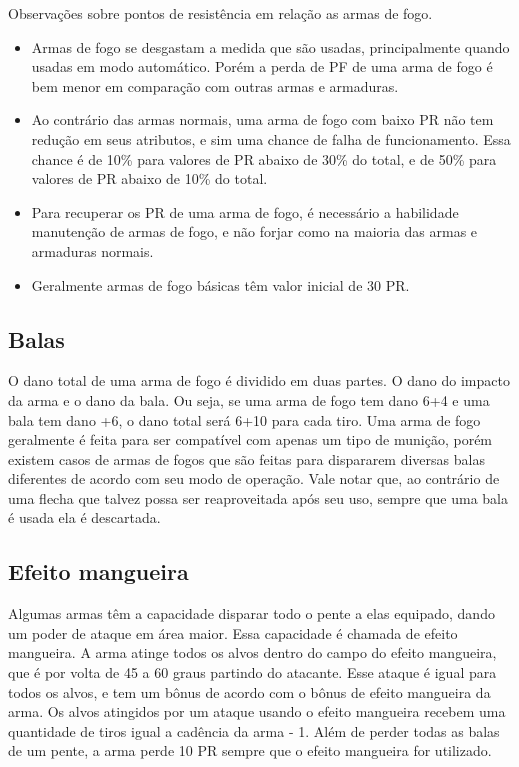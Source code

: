 Observações sobre pontos de resistência em relação as armas de fogo.
\begin{itemize}
	\item Armas de fogo se desgastam a medida que são usadas, principalmente quando usadas em modo automático. Porém a perda de PF de uma arma de fogo é bem menor em comparação com outras armas e armaduras. 

	\item Ao contrário das armas normais, uma arma de fogo com baixo PR não tem redução em seus atributos, e sim uma chance de falha de funcionamento. Essa chance é de 10\% para valores de PR abaixo de 30\% do total, e de 50\% para valores de PR abaixo de 10\% do total. 

	\item Para recuperar os PR de uma arma de fogo, é necessário a habilidade manutenção de armas de fogo, e não forjar como na maioria das armas e armaduras normais.

	\item Geralmente armas de fogo básicas têm valor inicial de 30 PR. 
\end{itemize}

\subsection{Balas}

O dano total de uma arma de fogo é dividido em duas partes. O dano do impacto da arma e o dano da bala. Ou seja, se uma arma de fogo tem dano 6+4 e uma bala tem dano +6, o dano total será 6+10 para cada tiro. Uma arma de fogo geralmente é feita para ser compatível com apenas um tipo de munição, porém existem casos de armas de fogos que são feitas para dispararem diversas balas diferentes de acordo com seu modo de operação. Vale notar que, ao contrário de uma flecha que talvez possa ser reaproveitada após seu uso, sempre que uma bala é usada ela é descartada.


\subsection{Efeito mangueira}

Algumas armas têm a capacidade disparar todo o pente a elas equipado, dando um poder de ataque em área maior. Essa capacidade é chamada de efeito mangueira. A arma atinge todos os alvos dentro do campo do efeito mangueira, que é por volta de 45 a 60 graus partindo do atacante. Esse ataque é igual para todos os alvos, e tem um bônus de acordo com o bônus de efeito mangueira da arma. Os alvos atingidos por um ataque usando o efeito mangueira recebem uma quantidade de tiros igual a cadência da arma - 1. Além de perder todas as balas de um pente, a arma perde 10 PR sempre que o efeito mangueira for utilizado.


